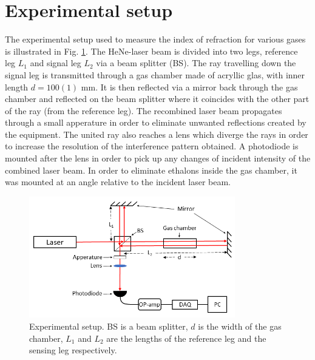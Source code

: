 \section{Experimental setup}

The experimental setup used to measure the index of refraction for various gases is illustrated in Fig. \ref{fig:experimentalSetup}. The HeNe-laser beam is divided into two legs, reference leg $L_1$ and signal leg $L_2$ via a beam splitter (BS). The ray travelling down the signal leg is transmitted through a gas chamber made of acryllic glas, with inner length $d=100(1)$ mm. It is then reflected via a mirror back through the gas chamber and reflected on the beam splitter where it coincides with the other part of the ray (from the reference leg). The recombined laser beam propagates through a small apperature in order to eliminate unwanted reflections created by the equipment. The united ray also reaches a lens which diverge the rays in order to increase the resolution of the interference pattern obtained. A photodiode is mounted after the lens in order to pick up any changes of incident intensity of the combined laser beam. In order to eliminate ethalons inside the gas chamber, it was mounted at an angle relative to the incident laser beam.

\begin{figure}[H]
  \centering
  \includegraphics[width=0.8\textwidth]{Exp_setup.png}
  \caption{Experimental setup. BS is a beam splitter, $d$ is the width of the gas chamber, $L_1$ and $L_2$ are the lengths of the reference leg and the sensing leg respectively.}
  \label{fig:experimentalSetup}
\end{figure}

